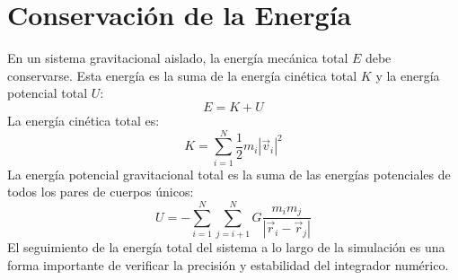 \documentclass{article}
\begin{document}
\section{Conservación de la Energía}
En un sistema gravitacional aislado, la energía mecánica total $E$ debe conservarse. Esta energía es la suma de la energía cinética total $K$ y la energía potencial total $U$:
\begin{equation}
E = K + U
\end{equation}
La energía cinética total es:
\begin{equation}
K = \sum_{i=1}^{N} \frac{1}{2} m_i |\vec{v}_i|^2
\end{equation}
La energía potencial gravitacional total es la suma de las energías potenciales de todos los pares de cuerpos únicos:
\begin{equation}
U = -\sum_{i=1}^{N} \sum_{j=i+1}^{N} G \frac{m_i m_j}{|\vec{r}_i - \vec{r}_j|}
\end{equation}
El seguimiento de la energía total del sistema a lo largo de la simulación es una forma importante de verificar la precisión y estabilidad del integrador numérico.
\end{document}
